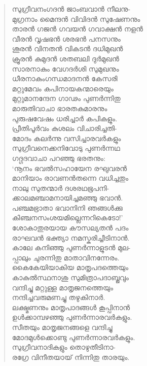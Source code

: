 \begin{verse}
സുഗ്രീവനംഗദന്‍ ജാംബവാന്‍ നീലനു-\\
മുഗ്രനാം മൈന്ദന്‍ വിവിദന്‍ സുഷേണനും\\
താരന്‍ ഗജന്‍ ഗവയന്‍ ഗവാക്ഷന്‍ നളന്‍\\
വീരന്‍ വൃഷഭന്‍ ശരഭന്‍ പനസനും\\
ശൂരന്‍ വിനതന്‍ വികടന്‍ ദധിമുഖന്‍\\
ക്രൂരന്‍ കുമുദന്‍ ശതബലി ദുര്‍മുഖന്‍\\
സാരനാകും വേഗദര്‍ശി സുമുഖനും\\
ധീരനാകുംഗന്ധമാദനന്‍ കേസരി\\
മറ്റുമേവം കപിനായകന്മാരെയും\\
മുറ്റുമാനന്ദേന ഗാഢം പുണര്‍ന്നിതു\\
മാരുതിവാചാ ഭാരതകുമാരനും\\
പുരുഷവേഷം ധരിച്ചാര്‍ കപികളും.\\
പ്രീതിപൂര്‍വം കുശലം വിചാരിച്ചതി-\\
മോദം കലര്‍ന്നു വസിച്ചാരവര്‍കളും\\
സുഗ്രീവനെക്കനിവോടു പുണര്‍ന്നഥ\\
ഗദ്ഗദവാചാ പറഞ്ഞു ഭരതനും:\\
‘നൂനം ഭവല്‍സഹായേന രഘുവരന്‍\\
മാനിയാം രാവണന്‍തന്നെ വധിച്ചതും\\
നാലു സുതന്മാര്‍ ദശരഥഭൂപനി-\\
ക്കാലമഞ്ചാമനായിച്ചമഞ്ഞു ഭവാന്‍.\\
പഞ്ചമഭ്രാതാ ഭവാനിനി ഞങ്ങള്‍ക്കു\\
കിഞ്ചനസംശയമില്ലെന്നറികെടോ!’\\
ശോകാതുരയായ കൗസല്യതന്‍ പദം\\
രാഘവന്‍ ഭക്ത്യാ നമസ്കരിച്ചീടിനാന്‍.\\
കാലേ കനിഞ്ഞു പുണര്‍ന്നാളുടന്‍ മുല-\\
പ്പാലും ചുരന്നിതു മാതാവിനന്നേരം.\\
കൈകേയിയാകിയ മാതൃപദത്തെയും\\
കാകുല്‍സ്ഥനാശു സുമിത്രാപദാബ്ജവും\\
വന്ദിച്ചു മറ്റുള്ള മാതൃജനത്തെയും\\
നന്ദിച്ചവരുമണച്ചു തഴുകിനാര്‍.\\
ലക്ഷ്മണനും മാതൃപാദങ്ങള്‍ കൂപ്പിനാന്‍\\
ഉള്‍ക്കാമ്പഴഞ്ഞു പുണര്‍ന്നാരവര്‍കളും.\\
സീതയും മാതൃജനങ്ങളെ വന്ദിച്ചു\\
മോദമുള്‍ക്കൊണ്ടു പുണര്‍ന്നാരവര്‍കളും.\\
സുഗ്രീവനാദികളും തൊഴുതീടിനാ-\\
രഗ്രേ വിനീതയായ് നിന്നിതു താരയും.\\

\end{verse}
